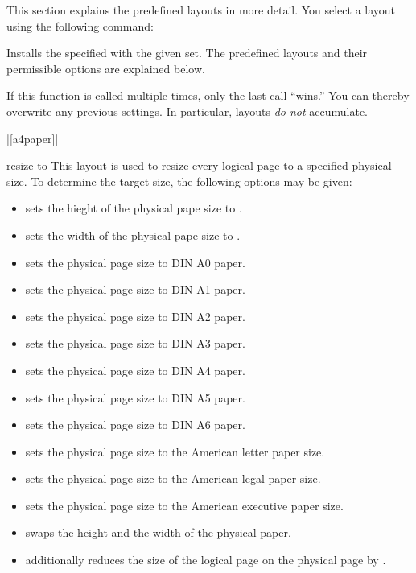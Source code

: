 This section explains the predefined layouts in more detail. You
select a layout using the following command:
\begin{command}{\pgfpagelayout{}}
  Installs the specified  with the given 
  set. The predefined layouts and their permissible options are
  explained below.

  If this function is called multiple times, only the last call
  ``wins.'' You can thereby overwrite any previous settings. In
  particular, layouts \emph{do not} accumulate.

  \example |[a4paper]|
\end{command}

\begin{pgflayout}{resize to}
  This layout is used to resize every logical page to a specified
  physical size. To determine the target size, the following options
  may be given:
  \begin{itemize}
  \item
     sets the
    hieght of the physical pape size to .
  \item
     sets the
    width of the physical pape size to .
  \item
     sets the physical page size to DIN A0 paper.
  \item
     sets the physical page size to DIN A1 paper.
  \item
     sets the physical page size to DIN A2 paper.
  \item
     sets the physical page size to DIN A3 paper.
  \item
     sets the physical page size to DIN A4 paper.
  \item
     sets the physical page size to DIN A5 paper.
  \item
     sets the physical page size to DIN A6 paper.
  \item
     sets the physical page size to the
    American letter paper size.
  \item
     sets the physical page size to the
    American legal paper size.
  \item
     sets the physical page size to the
    American executive paper size.
  \item
     swaps the height and the width of the
    physical paper.
  \item
     additionally reduces the
    size of the logical page on the physical page by .
  \end{itemize}
\end{pgflayout}

